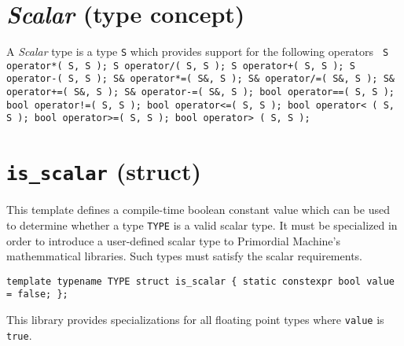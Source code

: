 \documentclass[oneside]{book}
\begin{document}
\section{\textit{Scalar} (type concept)}
A \textit{Scalar} type is a type \texttt{S} which provides support for the following operators\newline
\texttt{
S operator*( S, S );\newline
S operator/( S, S );\newline
S operator+( S, S );\newline
S operator-( S, S );\newline
\newline
S\& operator*=( S\&, S );\newline
S\& operator/=( S\&, S );\newline
S\& operator+=( S\&, S );\newline
S\& operator-=( S\&, S );\newline
\newline
bool operator==( S, S );\newline
bool operator!=( S, S );\newline
bool operator<=( S, S );\newline
bool operator< ( S, S );\newline
bool operator>=( S, S );\newline
bool operator> ( S, S );}

\section{\texttt{is\_scalar} (struct)}
This template defines a compile-time boolean constant value which can be used to
determine whether a type \texttt{TYPE} is a valid scalar type. It must        be
specialized in order to introduce a user-defined scalar type to       Primordial
Machine's mathemmatical libraries. Such types must satisfy the            scalar
requirements.

\noindent\texttt{template \textlangle typename TYPE\textrangle\newline
struct is\_scalar \{\newline
\hspace*{2em}static constexpr bool value = false;\newline
\};}

\noindent{}This library provides specializations for all floating point    types
where \texttt{value} is \texttt{true}.
\end{document}
